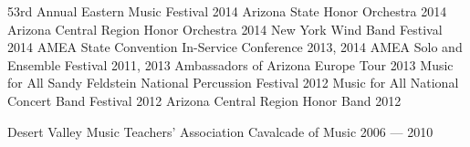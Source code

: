\begin{minipage}[t]{0.2\textwidth}
	\flushleft
\end{minipage}
\begin{minipage}[t]{0.75\textwidth}
	{
		\performance
		{53rd Annual Eastern Music Festival}
		{2014}
		\performance
		{Arizona State Honor Orchestra}
		{2014}
		\performance
		{Arizona Central Region Honor Orchestra}
		{2014}
		\performance
		{New York Wind Band Festival}
		{2014}
		\performance
		{AMEA State Convention In-Service Conference}
		{2013, 2014}
		\performance
		{AMEA Solo and Ensemble Festival}
		{2011, 2013}
		\performance
		{Ambassadors of Arizona Europe Tour}
		{2013}
		\performance
		{Music for All Sandy Feldstein National Percussion Festival}
		{2012}
		\performance
		{Music for All National Concert Band Festival}
		{2012}
		\performance
		{Arizona Central Region Honor Band}
		{2012}
	}

	\vspace*{-14pt}
	{
		\performance
		{Desert Valley Music Teachers' Association Cavalcade of Music}
		{2006 --- 2010}
	}

	\vspace*{-14pt}
\end{minipage}

\vspace{8pt}